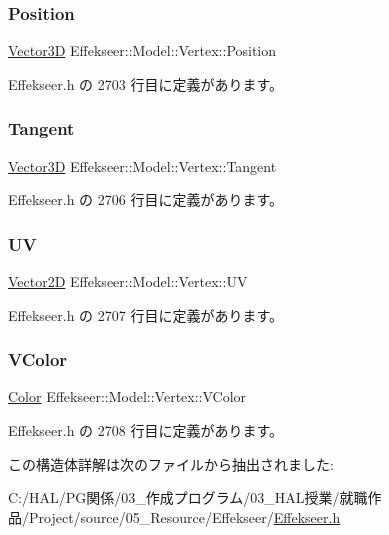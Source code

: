\subsubsection{\texorpdfstring{Position}{Position}}
{\footnotesize\ttfamily \mbox{\hyperlink{struct_effekseer_1_1_vector3_d}{Vector3D}} Effekseer\+::\+Model\+::\+Vertex\+::\+Position}



 Effekseer.\+h の 2703 行目に定義があります。

\mbox{\label{struct_effekseer_1_1_model_1_1_vertex_a5140b60278c5fb4b6d99afbf7966eb1a}} 
\subsubsection{\texorpdfstring{Tangent}{Tangent}}
{\footnotesize\ttfamily \mbox{\hyperlink{struct_effekseer_1_1_vector3_d}{Vector3D}} Effekseer\+::\+Model\+::\+Vertex\+::\+Tangent}



 Effekseer.\+h の 2706 行目に定義があります。

\mbox{\label{struct_effekseer_1_1_model_1_1_vertex_a4b16f6ed12f2a67a6064728c7fe37d7f}} 
\subsubsection{\texorpdfstring{UV}{UV}}
{\footnotesize\ttfamily \mbox{\hyperlink{struct_effekseer_1_1_vector2_d}{Vector2D}} Effekseer\+::\+Model\+::\+Vertex\+::\+UV}



 Effekseer.\+h の 2707 行目に定義があります。

\mbox{\label{struct_effekseer_1_1_model_1_1_vertex_a41a843c2f7d16433de79a01837a91a7f}} 
\subsubsection{\texorpdfstring{V\+Color}{VColor}}
{\footnotesize\ttfamily \mbox{\hyperlink{struct_effekseer_1_1_color}{Color}} Effekseer\+::\+Model\+::\+Vertex\+::\+V\+Color}



 Effekseer.\+h の 2708 行目に定義があります。



この構造体詳解は次のファイルから抽出されました\+:\begin{DoxyCompactItemize}
\item 
C\+:/\+H\+A\+L/\+P\+G関係/03\+\_\+作成プログラム/03\+\_\+\+H\+A\+L授業/就職作品/\+Project/source/05\+\_\+\+Resource/\+Effekseer/\mbox{\hyperlink{_effekseer_8h}{Effekseer.\+h}}\end{DoxyCompactItemize}

